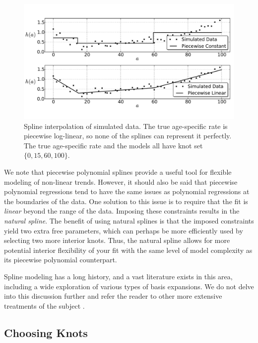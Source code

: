 \begin{figure}[h]
\begin{center}
\includegraphics[width=\textwidth]{splines-fig.pdf}
\caption{Spline interpolation of simulated data. The true age-specific
  rate is piecewise log-linear, so none of the splines can represent
  it perfectly. The true age-specific rate and the models all have
  knot set $\{0, 15, 60, 100\}$.}
\label{splines_fig}
\end{center}
\end{figure}

We note that piecewise polynomial splines provide a useful tool for
flexible modeling of non-linear trends. However, it should also be
said that piecewise polynomial regressions tend to have the same
issues as polynomial regressions at the boundaries of the data. One
solution to this issue is to require that the fit is \emph{linear}
beyond the range of the data. Imposing these constraints results in
the \emph{natural spline}. The benefit of using natural splines is
that the imposed constraints yield two extra free parameters, which
can perhaps be more efficiently used by selecting two more interior
knots. Thus, the natural spline allows for more potential interior
flexibility of your fit with the same level of model complexity as its
piecewise polynomial counterpart.

Spline modeling has a long history, and a vast literature exists in
this area, including a wide exploration of various types of basis
expansions. We do not delve into this discussion further and refer the
reader to other more extensive treatments of the subject
\cite{Wahba_Spline_1990,ESL}.

\subsection{Choosing Knots}

